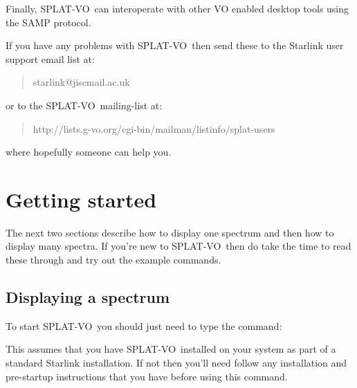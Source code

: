 \documentclass[twoside,11pt,nolof]{starlink}
\providecommand{\SPLAT}{\textsf{SPLAT-VO}}
\begin{document}
Finally, \SPLAT\ can interoperate with other VO enabled desktop tools using
the SAMP protocol.


If you have any problems with \SPLAT\, then send these to the Starlink user
support email list at:
\begin{quote}
\begin{terminalv}
   starlink@jiscmail.ac.uk
\end{terminalv}
\end{quote}
or to the \SPLAT\ mailing-list at:
\begin{quote}
\begin{terminalv}
http://lists.g-vo.org/cgi-bin/mailman/listinfo/splat-users
\end{terminalv}
\end{quote}

where hopefully someone can help you.

\section{Getting started}

The next two sections describe how to display one spectrum and then
how to display many spectra. If you're new to \SPLAT\ then do take the
time to read these through and try out the example commands.

\newpage

\subsection{Displaying a spectrum}

To start \SPLAT\ you should just need to type the command:
\begin{quote}
\begin{terminalv}
\end{terminalv}
\end{quote}
This assumes that you have \SPLAT\ installed on your system as part of a
standard Starlink installation. If not then you'll need follow any
installation and pre-startup instructions that you have before using
this command.
\end{document}
